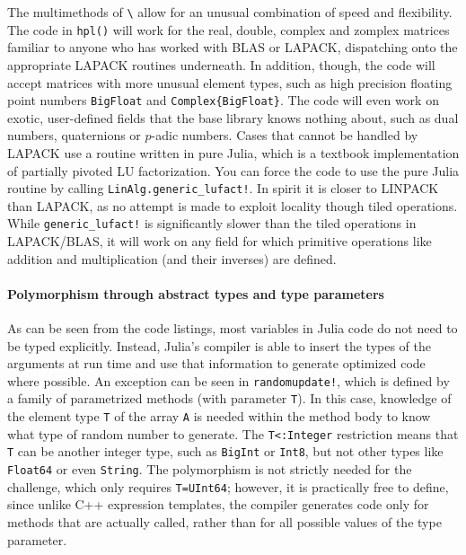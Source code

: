 \documentclass{article}
\begin{document}
The multimethods of \lstinline|\| allow for an unusual combination of speed and
flexibility. The code in \lstinline|hpl()| will work for the real, double,
complex and zomplex matrices familiar to anyone who has worked with BLAS or
LAPACK, dispatching onto the appropriate LAPACK routines underneath. In
addition, though, the code will accept matrices with more unusual element
types, such as high precision floating point numbers \lstinline|BigFloat| and
\lstinline|Complex{BigFloat}|. The code will even work on exotic, user-defined
fields that the base library knows nothing about, such as dual numbers,
quaternions or $p$-adic numbers. Cases that cannot be handled by LAPACK use a
routine written in pure Julia, which is a textbook implementation of partially
pivoted LU factorization. You can force the code to use the pure Julia routine
by calling \lstinline|LinAlg.generic_lufact!|. In spirit it is closer to
LINPACK than LAPACK, as no attempt is made to exploit locality though tiled
operations. While \lstinline|generic_lufact!| is significantly slower than the
tiled operations in LAPACK/BLAS, it will work on any field for which primitive
operations like addition and multiplication (and their inverses) are defined.

\paragraph{Polymorphism through abstract types and type parameters}
As can be seen from the code listings, most variables in Julia code do not need
to be typed explicitly. Instead, Julia's compiler is able to insert the types
of the arguments at run time and use that information to generate optimized
code where possible. An exception can be seen in \lstinline|randomupdate!|,
which is defined by a family of parametrized methods (with parameter \lstinline|T|).
In this case, knowledge of the element type \lstinline|T| of the array
\lstinline|A| is needed within the method body to know what type of random
number to generate. The \lstinline|T<:Integer| restriction means that
\lstinline|T| can be another integer type, such as \lstinline|BigInt| or
\lstinline|Int8|, but not other types like \lstinline|Float64| or even
\lstinline|String|. The polymorphism is not strictly needed for the challenge,
which only requires \lstinline|T=UInt64|; however, it is practically free to
define, since unlike C++ expression templates, the compiler generates code only
for methods that are actually called, rather than for all possible values of
the type parameter.
\end{document}
